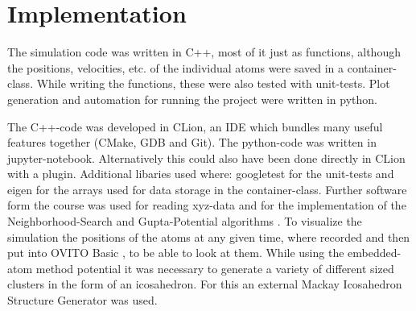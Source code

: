 \chapter{Implementation}
\begin{comment}	
	go about structure of the code 
	-> describe Code structure
		
	-> c++ was used to implement the code (mostly functional)
	-> key atoms container Class which holdes all the Values
	-> most functions were tested with googleTest
\end{comment}

\begin{comment}
code written in c++ most of it pretty functional, classes just used 
for the atoms container which holds the arrays 
while writing it also wrote the unittests with googletest
data aquiered form the code plotted with python
also where large simulations had to be run, called the program from the python code

\end{comment}
The simulation code was written in C++, most of it just as functions, although the positions, velocities, etc. of the individual atoms were saved in a container-class.
While writing the functions, these were also tested with unit-tests.
Plot generation and automation for running the project were written in python.

\begin{comment}
developed in CLion which as an integrated git inviroment
Clion builds with Cmake then clang as a compiler
debugger is gdb(nicely hidden)
- additianal bibs where :
	googletest	for unittests
	eigen		for arrays 
- software used form the class itself 
- ovito for visualization
\end{comment}
The C++-code was developed in CLion, an IDE which bundles many useful features together (CMake, GDB and Git).
The python-code was written in jupyter-notebook. Alternatively this could also have been done directly in CLion with a plugin. 
Additional libaries used where: googletest \cite{googletest} for the unit-tests and eigen \cite{eigen} for the arrays used for data storage in the container-class. 
Further software form the course was used for reading xyz-data and for the implementation of the Neighborhood-Search and Gupta-Potential algorithms \cite{molDymCourse}. 
To visualize the simulation the positions of the atoms at any given time, where recorded and then put into OVITO Basic \cite{ovito}, to be able to look at them.
While using the embedded-atom method potential it was necessary to generate a variety of different sized clusters in the form of an icosahedron. For this an external Mackay Icosahedron Structure Generator \cite{icosader} was used.
\begin{comment}
--
code is structured into the milestones, so an individual milestone can be rerun in case of fuckup
parted into h and cpp files as usual
followed the structure of the milestone
\end{comment}

